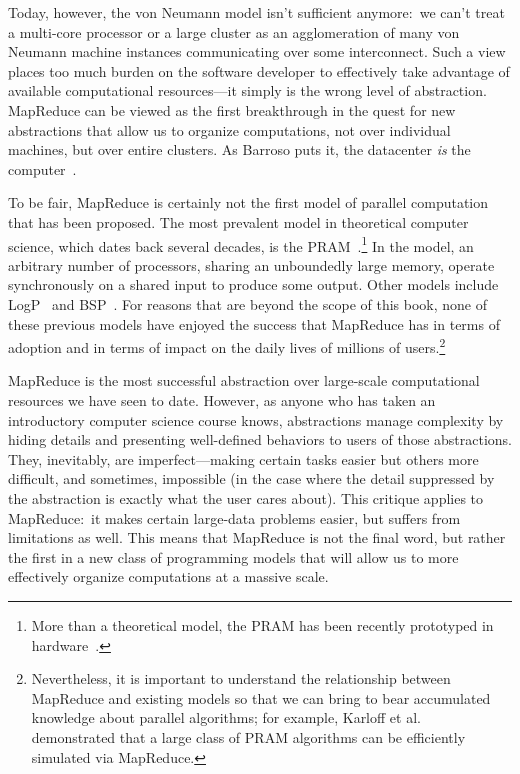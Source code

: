 Today, however, the von Neumann model isn't sufficient anymore:\ we
can't treat a multi-core processor or a large cluster as an
agglomeration of many von Neumann machine instances communicating over
some interconnect.  Such a view places too much burden on the software
developer to effectively take advantage of available computational
resources---it simply is the wrong level of abstraction.  MapReduce
can be viewed as the first breakthrough in the quest for new
abstractions that allow us to organize computations, not over
individual machines, but over entire clusters.  As Barroso puts it,
the datacenter \emph{is} the
computer~\cite{Barroso_Holzle_2009,Patterson_CACM2008}.

To be fair, MapReduce is certainly not the first model of parallel
computation that has been proposed.  The most prevalent model in
theoretical computer science, which dates back several decades, is the
PRAM~\cite{JaJa_1992,Grama_etal_2003}.\footnote{More than a
  theoretical model, the PRAM has been recently prototyped in
  hardware~\cite{Wen_Vishkin_2008}.} In the model, an arbitrary number
of processors, sharing an unboundedly large memory, operate
synchronously on a shared input to produce some output.  Other models
include LogP~\cite{Culler_etal_1993} and BSP~\cite{Valiant_CACM1990}.
For reasons that are beyond the scope of this book, none of these
previous models have enjoyed the success that MapReduce has in terms
of adoption and in terms of impact on the daily lives of millions of
users.\footnote{Nevertheless, it is important to understand the
  relationship between MapReduce and existing models so that we can
  bring to bear accumulated knowledge about parallel algorithms; for
  example, Karloff et al.~\cite{Karloff_etal_2010} demonstrated that a
  large class of PRAM algorithms can be efficiently simulated via
  MapReduce.}

MapReduce is the most successful abstraction over large-scale
computational resources we have seen to date.  However, as anyone who
has taken an introductory computer science course knows, abstractions
manage complexity by hiding details and presenting well-defined
behaviors to users of those abstractions.  They, inevitably, are
imperfect---making certain tasks easier but others more difficult, and
sometimes, impossible (in the case where the detail suppressed by the
abstraction is exactly what the user cares about).  This critique
applies to MapReduce:\ it makes certain large-data problems easier,
but suffers from limitations as well.  This means that MapReduce is
not the final word, but rather the first in a new class of programming
models that will allow us to more effectively organize computations at
a massive scale.

